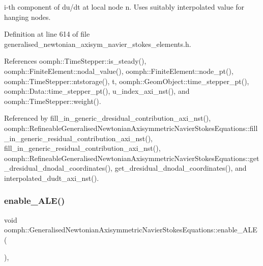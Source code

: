 i-\/th component of du/dt at local node n. Uses suitably interpolated value for hanging nodes. 



Definition at line 614 of file generalised\+\_\+newtonian\+\_\+axisym\+\_\+navier\+\_\+stokes\+\_\+elements.\+h.



References oomph\+::\+Time\+Stepper\+::is\+\_\+steady(), oomph\+::\+Finite\+Element\+::nodal\+\_\+value(), oomph\+::\+Finite\+Element\+::node\+\_\+pt(), oomph\+::\+Time\+Stepper\+::ntstorage(), t, oomph\+::\+Geom\+Object\+::time\+\_\+stepper\+\_\+pt(), oomph\+::\+Data\+::time\+\_\+stepper\+\_\+pt(), u\+\_\+index\+\_\+axi\+\_\+nst(), and oomph\+::\+Time\+Stepper\+::weight().



Referenced by fill\+\_\+in\+\_\+generic\+\_\+dresidual\+\_\+contribution\+\_\+axi\+\_\+nst(), oomph\+::\+Refineable\+Generalised\+Newtonian\+Axisymmetric\+Navier\+Stokes\+Equations\+::fill\+\_\+in\+\_\+generic\+\_\+residual\+\_\+contribution\+\_\+axi\+\_\+nst(), fill\+\_\+in\+\_\+generic\+\_\+residual\+\_\+contribution\+\_\+axi\+\_\+nst(), oomph\+::\+Refineable\+Generalised\+Newtonian\+Axisymmetric\+Navier\+Stokes\+Equations\+::get\+\_\+dresidual\+\_\+dnodal\+\_\+coordinates(), get\+\_\+dresidual\+\_\+dnodal\+\_\+coordinates(), and interpolated\+\_\+dudt\+\_\+axi\+\_\+nst().

\mbox{\label{classoomph_1_1GeneralisedNewtonianAxisymmetricNavierStokesEquations_a4c9db571735ff4411cb69f610d86cbf2}} 
\subsubsection{\texorpdfstring{enable\+\_\+\+A\+L\+E()}{enable\_ALE()}}
{\footnotesize\ttfamily void oomph\+::\+Generalised\+Newtonian\+Axisymmetric\+Navier\+Stokes\+Equations\+::enable\+\_\+\+A\+LE (\begin{DoxyParamCaption}{ }\end{DoxyParamCaption})\hspace{0.3cm}{\ttfamily [inline]}, {\ttfamily [virtual]}}



